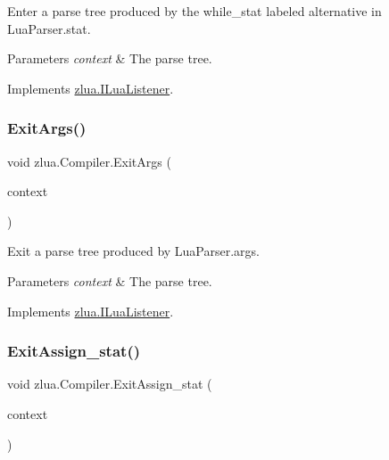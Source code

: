 Enter a parse tree produced by the {\ttfamily while\+\_\+stat} labeled alternative in Lua\+Parser.\+stat. 


\begin{DoxyParams}{Parameters}
{\em context} & The parse tree.\\
\hline
\end{DoxyParams}


Implements \mbox{\hyperlink{interfacezlua_1_1_i_lua_listener_abc1fb6386fa985aa88c2813bc1040876}{zlua.\+I\+Lua\+Listener}}.

\mbox{\label{classzlua_1_1_compiler_ae35672ab6cc512e4dab4ddc9063d9f22}} 
\subsubsection{\texorpdfstring{Exit\+Args()}{ExitArgs()}}
{\footnotesize\ttfamily void zlua.\+Compiler.\+Exit\+Args (\begin{DoxyParamCaption}\item[{\mbox{[}\+Not\+Null\mbox{]} \mbox{\hyperlink{classzlua_1_1_lua_parser_1_1_args_context}{Lua\+Parser.\+Args\+Context}}}]{context }\end{DoxyParamCaption})}



Exit a parse tree produced by Lua\+Parser.\+args. 


\begin{DoxyParams}{Parameters}
{\em context} & The parse tree.\\
\hline
\end{DoxyParams}


Implements \mbox{\hyperlink{interfacezlua_1_1_i_lua_listener_ad480b971cdba492e0fb0221dc80bb690}{zlua.\+I\+Lua\+Listener}}.

\mbox{\label{classzlua_1_1_compiler_a122e9a6b8770d627e6461baee20fcf62}} 
\subsubsection{\texorpdfstring{Exit\+Assign\+\_\+stat()}{ExitAssign\_stat()}}
{\footnotesize\ttfamily void zlua.\+Compiler.\+Exit\+Assign\+\_\+stat (\begin{DoxyParamCaption}\item[{\mbox{[}\+Not\+Null\mbox{]} \mbox{\hyperlink{classzlua_1_1_lua_parser_1_1_assign__stat_context}{Lua\+Parser.\+Assign\+\_\+stat\+Context}}}]{context }\end{DoxyParamCaption})}



